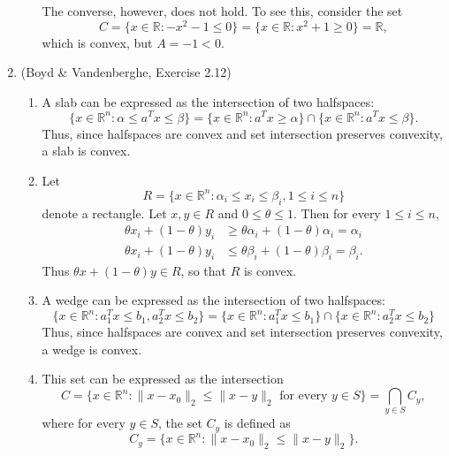 \documentclass[letterpaper,12pt]{article}
\begin{document}
\begin{enumerate}
\begin{enumerate}
  \bigskip

  The converse, however, does not hold. To see this, consider the set
  \begin{equation*}
    C = \{x \in \mathbb{R} : -x^2 - 1 \leq 0\}
      = \{x \in \mathbb{R} : x^2 + 1 \geq 0\}
      = \mathbb{R},
  \end{equation*}
  which is convex, but $A = -1 < 0$.
\end{enumerate}

\item (Boyd \& Vandenberghe, Exercise 2.12)
\begin{enumerate}
\item A slab can be expressed as the intersection of two halfspaces:
  \begin{equation*}
    \{x \in \mathbb{R}^n : \alpha \leq a^T x \leq \beta\}
      = \{x \in \mathbb{R}^n : a^T x \geq \alpha\}
          \cap \{x \in \mathbb{R}^n : a^T x \leq \beta\}.
  \end{equation*}
  Thus, since halfspaces are convex and set intersection preserves
  convexity, a slab is convex.

\item Let
  \begin{equation*}
    R = \{x \in \mathbb{R}^n :
      \alpha_i \leq x_i \leq \beta_i, 1 \leq i \leq n\}
  \end{equation*}
  denote a rectangle. Let $x, y \in R$ and $0 \leq \theta \leq
  1$. Then for every $1 \leq i \leq n$,
  \begin{align*}
    \theta x_i + (1 - \theta) y_i
      &\geq \theta \alpha_i + (1 - \theta) \alpha_i
      = \alpha_i \\
    \theta x_i + (1 - \theta) y_i
      &\leq \theta \beta_i + (1 - \theta) \beta_i
      = \beta_i.
  \end{align*}
  Thus $\theta x + (1 - \theta) y \in R$, so that $R$ is convex.

\item A wedge can be expressed as the intersection of two halfspaces:
  \begin{equation*}
    \{x \in \mathbb{R}^n : a_1^T x \leq b_1, a_2^T x \leq b_2\}
      = \{x \in \mathbb{R}^n : a_1^T x \leq b_1\}
          \cap \{x \in \mathbb{R}^n : a_2^T x \leq b_2\}
  \end{equation*}
  Thus, since halfspaces are convex and set intersection preserves
  convexity, a wedge is convex.

\item This set can be expressed as the intersection
  \begin{equation*}
    C = \{x \in \mathbb{R}^n : \lVert x - x_0 \rVert_2
          \leq \lVert x - y \rVert_2 \text{ for every $y \in S$}\}
    = \bigcap_{y \in S} C_y,
  \end{equation*}
  where for every $y \in S$, the set $C_y$ is defined as
  \begin{equation*}
    C_y = \{x \in \mathbb{R}^n :
      \lVert x - x_0 \rVert_2 \leq \lVert x - y \rVert_2\}.
  \end{equation*}


\end{enumerate}
\end{enumerate}
\end{document}

